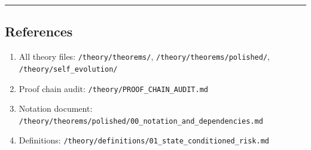\documentclass[
  12pt,
]{ctexart}
\providecommand{\tightlist}{%
  \setlength{\itemsep}{0pt}\setlength{\parskip}{0pt}}
\begin{document}
\begin{center}\rule{0.5\linewidth}{0.5pt}\end{center}

\subsection{References}\label{references}

\begin{enumerate}
\def\labelenumi{\arabic{enumi}.}
\tightlist
\item
  All theory files: \texttt{/theory/theorems/},
  \texttt{/theory/theorems/polished/}, \texttt{/theory/self\_evolution/}
\item
  Proof chain audit: \texttt{/theory/PROOF\_CHAIN\_AUDIT.md}
\item
  Notation document:
  \texttt{/theory/theorems/polished/00\_notation\_and\_dependencies.md}
\item
  Definitions:
  \texttt{/theory/definitions/01\_state\_conditioned\_risk.md}
\end{enumerate}
\end{document}
